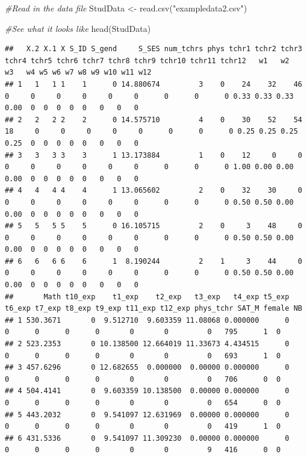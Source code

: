 \documentclass[
]{book}
\newenvironment{Shaded}{\begin{snugshade}}{\end{snugshade}}
\newcommand{\CommentTok}[1]{\textcolor[rgb]{0.56,0.35,0.01}{\textit{#1}}}
\newcommand{\FunctionTok}[1]{\textcolor[rgb]{0.00,0.00,0.00}{#1}}
\newcommand{\NormalTok}[1]{#1}
\newcommand{\OtherTok}[1]{\textcolor[rgb]{0.56,0.35,0.01}{#1}}
\newcommand{\StringTok}[1]{\textcolor[rgb]{0.31,0.60,0.02}{#1}}
\begin{document}
\begin{Shaded}
\begin{Highlighting}[]
\CommentTok{\#Read in the data file}
\NormalTok{StudData }\OtherTok{\textless{}{-}} \FunctionTok{read.csv}\NormalTok{(}\StringTok{"exampledata2.csv"}\NormalTok{)}

\CommentTok{\#See what it looks like}
\FunctionTok{head}\NormalTok{(StudData)}
\end{Highlighting}
\end{Shaded}

\begin{verbatim}
##   X.2 X.1 X S_ID S_gend     S_SES num_tchrs phys tchr1 tchr2 tchr3 tchr4 tchr5 tchr6 tchr7 tchr8 tchr9 tchr10 tchr11 tchr12   w1   w2   w3   w4 w5 w6 w7 w8 w9 w10 w11 w12
## 1   1   1 1    1      0 14.880674         3    0    24    32    46     0     0     0     0     0     0      0      0      0 0.33 0.33 0.33 0.00  0  0  0  0  0   0   0   0
## 2   2   2 2    2      0 14.575710         4    0    30    52    54    18     0     0     0     0     0      0      0      0 0.25 0.25 0.25 0.25  0  0  0  0  0   0   0   0
## 3   3   3 3    3      1 13.173884         1    0    12     0     0     0     0     0     0     0     0      0      0      0 1.00 0.00 0.00 0.00  0  0  0  0  0   0   0   0
## 4   4   4 4    4      1 13.065602         2    0    32    30     0     0     0     0     0     0     0      0      0      0 0.50 0.50 0.00 0.00  0  0  0  0  0   0   0   0
## 5   5   5 5    5      0 16.105715         2    0     3    48     0     0     0     0     0     0     0      0      0      0 0.50 0.50 0.00 0.00  0  0  0  0  0   0   0   0
## 6   6   6 6    6      1  8.190244         2    1     3    44     0     0     0     0     0     0     0      0      0      0 0.50 0.50 0.00 0.00  0  0  0  0  0   0   0   0
##       Math t10_exp    t1_exp    t2_exp   t3_exp   t4_exp t5_exp t6_exp t7_exp t8_exp t9_exp t11_exp t12_exp phys_tchr SAT_M female NB
## 1 530.3671       0  9.512710  9.603359 11.08068 0.000000      0      0      0      0      0       0       0         0   795      1  0
## 2 523.2353       0 10.138500 12.664019 11.33673 4.434515      0      0      0      0      0       0       0         0   693      1  0
## 3 457.6296       0 12.682655  0.000000  0.00000 0.000000      0      0      0      0      0       0       0         0   706      0  0
## 4 504.4141       0  9.603359 10.138500  0.00000 0.000000      0      0      0      0      0       0       0         0   654      0  0
## 5 443.2032       0  9.541097 12.631969  0.00000 0.000000      0      0      0      0      0       0       0         0   419      1  0
## 6 431.5336       0  9.541097 11.309230  0.00000 0.000000      0      0      0      0      0       0       0         9   416      0  0
\end{verbatim}
\end{document}

